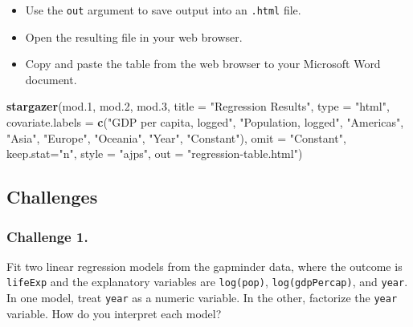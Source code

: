 \documentclass[]{book}
\newenvironment{Shaded}{\begin{snugshade}}{\end{snugshade}}
\newcommand{\DataTypeTok}[1]{\textcolor[rgb]{0.13,0.29,0.53}{#1}}
\newcommand{\FloatTok}[1]{\textcolor[rgb]{0.00,0.00,0.81}{#1}}
\newcommand{\KeywordTok}[1]{\textcolor[rgb]{0.13,0.29,0.53}{\textbf{#1}}}
\newcommand{\NormalTok}[1]{#1}
\newcommand{\StringTok}[1]{\textcolor[rgb]{0.31,0.60,0.02}{#1}}
\providecommand{\tightlist}{%
  \setlength{\itemsep}{0pt}\setlength{\parskip}{0pt}}
\begin{document}
\begin{itemize}
\tightlist
\item
  Use the \texttt{out} argument to save output into an \texttt{.html} file.
\item
  Open the resulting file in your web browser.
\item
  Copy and paste the table from the web browser to your Microsoft Word document.
\end{itemize}

\begin{Shaded}
\begin{Highlighting}[]
\KeywordTok{stargazer}\NormalTok{(mod}\FloatTok{.1}\NormalTok{, mod}\FloatTok{.2}\NormalTok{, mod}\FloatTok{.3}\NormalTok{, }\DataTypeTok{title =} \StringTok{"Regression Results"}\NormalTok{, }\DataTypeTok{type =} \StringTok{"html"}\NormalTok{, }
          \DataTypeTok{covariate.labels  =} \KeywordTok{c}\NormalTok{(}\StringTok{"GDP per capita, logged"}\NormalTok{, }\StringTok{"Population, logged"}\NormalTok{, }\StringTok{"Americas"}\NormalTok{, }\StringTok{"Asia"}\NormalTok{, }\StringTok{"Europe"}\NormalTok{, }\StringTok{"Oceania"}\NormalTok{, }\StringTok{"Year"}\NormalTok{, }\StringTok{"Constant"}\NormalTok{), }
          \DataTypeTok{omit =} \StringTok{"Constant"}\NormalTok{, }
          \DataTypeTok{keep.stat=}\StringTok{"n"}\NormalTok{, }\DataTypeTok{style =} \StringTok{"ajps"}\NormalTok{,}
          \DataTypeTok{out =} \StringTok{"regression-table.html"}\NormalTok{)}
\end{Highlighting}
\end{Shaded}

\hypertarget{challenges-14}{%
\subsection{Challenges}\label{challenges-14}}

\hypertarget{challenge-1.-10}{%
\subsubsection*{Challenge 1.}\label{challenge-1.-10}}

Fit two linear regression models from the gapminder data, where the outcome is \texttt{lifeExp} and the explanatory variables are \texttt{log(pop)}, \texttt{log(gdpPercap)}, and \texttt{year}. In one model, treat \texttt{year} as a numeric variable. In the other, factorize the \texttt{year} variable. How do you interpret each model?
\end{document}
